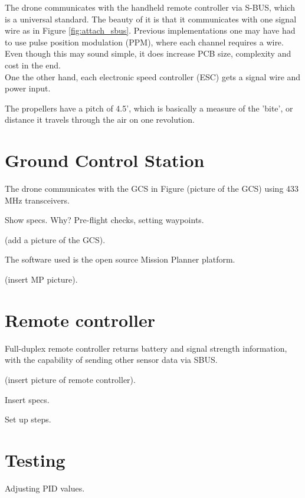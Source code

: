The drone communicates with the handheld remote controller via S-BUS, which is a universal standard. The beauty of it is that it communicates with one signal wire as in Figure \ref{fig:attach_sbus}. Previous implementations one may have had to use pulse position modulation (PPM), where each channel requires a wire. Even though this may sound simple, it does increase PCB size, complexity and cost in the end.\\

\noindent
One the other hand, each electronic speed controller (ESC) gets a signal wire and power input.

\noindent
The propellers have a pitch of 4.5', which is basically a measure of the 'bite', or distance it travels through the air on one revolution.

\section{Ground Control Station}

The drone communicates with the GCS in Figure (picture of the GCS) using 433 MHz transceivers.

Show specs. Why? Pre-flight checks, setting waypoints.

(add a picture of the GCS).

The software used is the open source Mission Planner platform.

(insert MP picture).

\section{Remote controller}

Full-duplex remote controller returns battery and signal strength information, with the capability of sending other sensor data via SBUS.

(insert picture of remote controller).

Insert specs.

Set up steps.

\section{Testing}

Adjusting PID values.